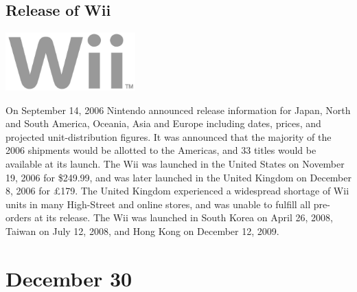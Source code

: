 \documentclass[11pt]{report}
\begin{document}
\subsection{Release of Wii}
\vspace{2mm}\begin{center}\includegraphics[width=5cm]{./img/wiiLogo.jpg}\end{center}
On September 14, 2006 Nintendo announced release information for Japan, North and South America, Oceania, Asia and Europe including dates, prices, and projected unit-distribution figures. It was announced that the majority of the 2006 shipments would be allotted to the Americas, and 33 titles would be available at its launch. The Wii was launched in the United States on November 19, 2006 for \$249.99, and was later launched in the United Kingdom on December 8, 2006 for £179. The United Kingdom experienced a widespread shortage of Wii units in many High-Street and online stores, and was unable to fulfill all pre-orders at its release. The Wii was launched in South Korea on April 26, 2008, Taiwan on July 12, 2008, and Hong Kong on December 12, 2009.
\section{December 30}
\end{document}
